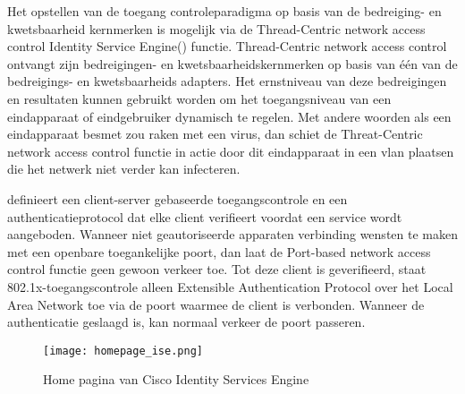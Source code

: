\newline
Het opstellen van de toegang controleparadigma op basis van de bedreiging- en kwetsbaarheid kernmerken is mogelijk via de Thread-Centric network access control Identity Service Engine(\cite{TCNAC}) functie. Thread-Centric network access control ontvangt zijn bedreigingen- en kwetsbaarheidskernmerken op basis van één van de bedreigings- en kwetsbaarheids adapters. Het ernstniveau van deze bedreigingen en resultaten kunnen gebruikt worden om het toegangsniveau van een eindapparaat of eindgebruiker dynamisch te regelen.
\newline
\newline
Met andere woorden als een eindapparaat besmet zou raken met een virus, dan schiet de Threat-Centric network access control functie in actie door dit eindapparaat in een vlan plaatsen die het netwerk niet verder kan infecteren. 

\newline
\cite{PBAC} definieert een client-server gebaseerde toegangscontrole en een authenticatieprotocol dat elke client verifieert voordat een service wordt aangeboden. Wanneer niet geautoriseerde apparaten verbinding wensten te maken met een openbare toegankelijke poort, dan laat de Port-based network access control functie geen gewoon verkeer toe.
\newline
\newline
Tot deze client is geverifieerd, staat 802.1x-toegangscontrole alleen Extensible Authentication Protocol over het Local Area Network toe via de poort waarmee de client is verbonden. Wanneer de authenticatie geslaagd is, kan normaal verkeer de poort passeren.

\begin{figure}[H]
	\centering
	\texttt{[image: homepage\_ise.png]}
	\caption{Home pagina van Cisco Identity Services Engine}
	\label{fig:homeISE}
\end{figure}

